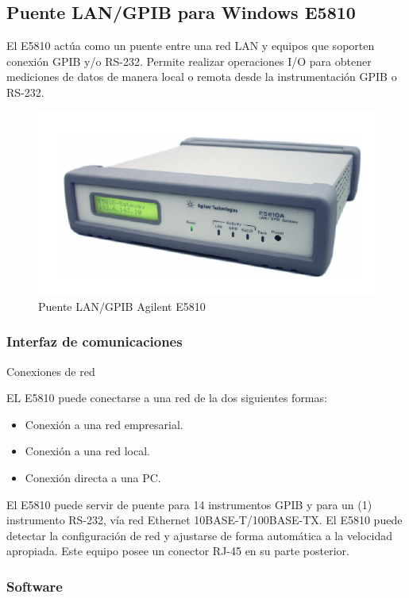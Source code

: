 \subsection{Puente LAN/GPIB para Windows E5810}

El E5810 actúa como un puente entre una red LAN y equipos que soporten conexión GPIB y/o RS-232.  Permite   realizar operaciones I/O para obtener mediciones de datos de manera local o remota desde la instrumentación GPIB o RS-232.

\begin{figure} 
	\centering
	\includegraphics{Imagenes/E5810.pdf}
	\caption{Puente LAN/GPIB Agilent E5810}
	\label{Fig:PuenteLanGPIB}
\end{figure}

\subsubsection{Interfaz de comunicaciones}
Conexiones de red

EL E5810 puede conectarse a una red de la dos siguientes formas: 

\begin{itemize}
	\item Conexión a una red empresarial.
	\item Conexión a una red local.
	\item Conexión directa a una PC.
\end{itemize}

El E5810 puede servir de puente para 14 instrumentos GPIB y para un (1) instrumento RS-232, vía red Ethernet  10BASE-T/100BASE-TX. El E5810 puede detectar la configuración de red y ajustarse de forma automática a la velocidad apropiada. Este equipo posee un conector RJ-45 en su parte posterior. 

\subsubsection{Software}

